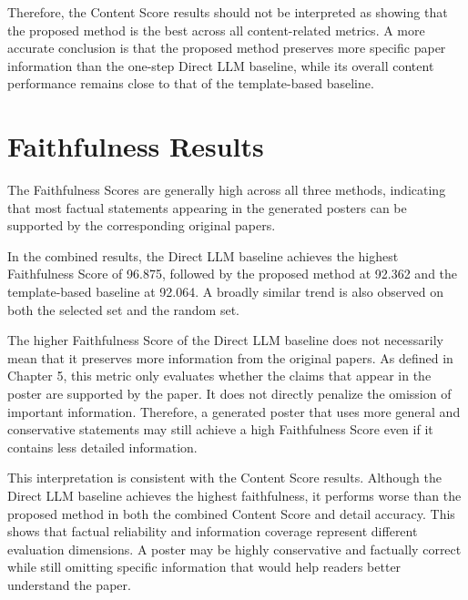 \documentclass[12pt,oneside]{report}
\begin{document}
\vspace{1em}

Therefore, the Content Score results should not be interpreted as showing that the proposed method is the best across all content-related metrics. A more accurate conclusion is that the proposed method preserves more specific paper information than the one-step Direct LLM baseline, while its overall content performance remains close to that of the template-based baseline.

\section{Faithfulness Results}

The Faithfulness Scores are generally high across all three methods, indicating that most factual statements appearing in the generated posters can be supported by the corresponding original papers.

\vspace{1em}

In the combined results, the Direct LLM baseline achieves the highest Faithfulness Score of 96.875, followed by the proposed method at 92.362 and the template-based baseline at 92.064. A broadly similar trend is also observed on both the selected set and the random set.

\vspace{1em}

The higher Faithfulness Score of the Direct LLM baseline does not necessarily mean that it preserves more information from the original papers. As defined in Chapter 5, this metric only evaluates whether the claims that appear in the poster are supported by the paper. It does not directly penalize the omission of important information. Therefore, a generated poster that uses more general and conservative statements may still achieve a high Faithfulness Score even if it contains less detailed information.

\vspace{1em}

This interpretation is consistent with the Content Score results. Although the Direct LLM baseline achieves the highest faithfulness, it performs worse than the proposed method in both the combined Content Score and detail accuracy. This shows that factual reliability and information coverage represent different evaluation dimensions. A poster may be highly conservative and factually correct while still omitting specific information that would help readers better understand the paper.
\end{document}
